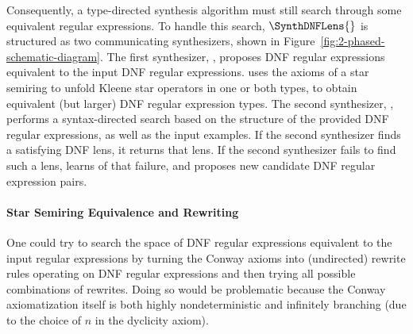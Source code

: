 \documentclass[sigplan,acmsmall]{acmart}
\begin{document}
Consequently, a type-directed synthesis algorithm must still search through
some equivalent regular expressions.
To handle this search, $\SynthDNFLens{}$ is structured as two
communicating synthesizers, shown in Figure~\ref{fig:2-phased-schematic-diagram}.
The first synthesizer, \TypeProp{}, proposes DNF regular expressions
equivalent to the input DNF regular expressions.
\TypeProp{} uses the axioms of a star semiring to unfold Kleene star
operators in one or both types, to obtain equivalent (but larger) DNF regular
expression types. The second synthesizer, \RigidSynth{}, performs a
syntax-directed search based on the structure of the provided DNF regular
expressions, as well as the input examples. If the second synthesizer finds a
satisfying DNF lens, it returns that lens.  If the second synthesizer fails to
find such a lens, \TypeProp{} learns of that failure,
and proposes new candidate DNF regular expression pairs.

\paragraph*{Star Semiring Equivalence and Rewriting}

One could try to search the space of DNF regular expressions equivalent to
the input regular expressions by turning the Conway axioms into (undirected)
rewrite rules operating on DNF regular expressions
and then trying all possible combinations of rewrites.  Doing so would
be problematic because the Conway axiomatization itself is both highly
nondeterministic and infinitely branching (due to the choice of $n$ in
the dyclicity axiom).
\end{document}
